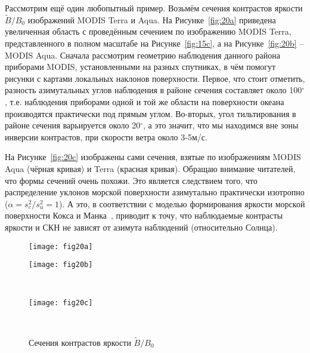Рассмотрим ещё один любопытный пример. Возьмём сечения контрастов яркости $\tilde{B}/B_{0}$ изображений MODIS Terra и Aqua. На Рисунке~\ref{fig:20a} приведена увеличенная область с проведённым сечением по изображению MODIS Terra, представленного в полном масштабе на Рисунке~\ref{fig:15c},  а на Рисунке~\ref{fig:20b} --  MODIS Aqua. Сначала рассмотрим геометрию наблюдения данного района приборами MODIS, установленными на разных спутниках, в чём помогут рисунки с картами локальных наклонов поверхности. Первое, что стоит отметить, разность азимутальных углов наблюдения в районе сечения составляет около 100${}^\circ$, т.е. наблюдения приборами одной и той же области на поверхности океана производятся практически под прямым углом. Во-вторых, угол тильтирования в районе сечения варьируется около 20${}^\circ$, а это значит, что мы находимся вне зоны инверсии контрастов, при скорости ветра около 3-5м/с.

На Рисунке~\ref{fig:20c} изображены сами сечения, взятые по изображениям MODIS Aqua (чёрная кривая) и Terra (красная кривая). Обращаю внимание читателей, что формы сечений очень похожи. Это является следствием того, что распределение уклонов морской поверхности азимутально практически изотропно ($\alpha =s_{c}^{2} /s_{u}^{2} =1$). А это, в соответствии с моделью формирования яркости морской поверхности Кокса и Манка~\citep{Cox1954}, приводит к точу, что наблюдаемые контрасты яркости и СКН не зависят от азимута наблюдений (относительно Солнца).



\begin{figure}[!h]
    	\centering
	\begin{minipage}{.47\textwidth}
	    \subcaptionbox{\label{fig:20a}}
		{\texttt{[image: fig20a]}}
	\end{minipage}
	\hfill
	\begin{minipage}{.47\textwidth}
	    \subcaptionbox{\label{fig:20b}}
		{\texttt{[image: fig20b]}}
	\end{minipage}
	\hfill
	\\
	\begin{minipage}{.47\textwidth}
	    \subcaptionbox{\label{fig:20c}}
		{\texttt{[image: fig20c]}}
	\end{minipage}
	\\
    \caption{Сечения контрастов яркости $\tilde{B}/B_{0}$}
    \label{fig:20}
\end{figure}


